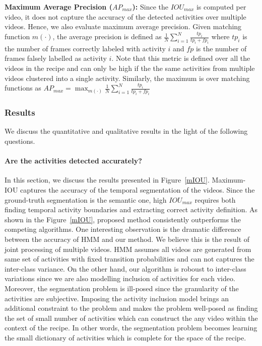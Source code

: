 \noindent\textbf{Maximum Average Precision ($AP_{max}$):}
Since the $IOU_{max}$ is computed per video, it does not capture the accuracy of the detected activities over multiple videos. Hence, we also evaluate maximum average precision. Given matching function $m(\cdot)$, the average precision is defined as $\frac{1}{N}\sum_{i =1}^N\frac{tp_i}{tp_i+fp_i}$ where $tp_i$ is the number of frames correctly labeled with activity $i$ and $fp$ is the number of frames falsely labelled as activity $i$. Note that this metric is defined over all the videos in the recipe and can only be high if the the same activities from multiple videos clustered into a single activity. Similarly, the maximum is over matching functions as \mbox{$AP_{max}=\max_{m(\cdot)} \frac{1}{N}\sum_{i =1}^N\frac{tp_i}{tp_i+fp_i}$} 


\subsubsection{Results}
We discuss the quantitative and qualitative results in the light of the following questions.
\paragraph{Are the activities detected accurately?}
In this section, we discuss the results presented in Figure~\ref{mIOU}. Maximum-IOU captures the accuracy of the temporal segmentation of the videos. Since the ground-truth segmentation is the semantic one, high $IOU_{max}$ requires both finding temporal activity boundaries and extracting correct activity definition. As shown in the Figure~\ref{mIOU}, proposed method consistently outperforms the competing algorithms. One interesting observation is the dramatic difference between the accuracy of HMM and our method. We believe this is the result of joint processing of multiple videos. HMM assumes all videos are generated from same set of activities with fixed transition probabilities and can not captures the inter-class variance. On the other hand, our algorithm is roboust to inter-class variations since we are also modelling inclusion of activities for each video. Moreover, the segmentation problem is ill-posed since the granularity of the activities are subjective. Imposing the activity inclusion model brings an additional constraint to the problem and makes the problem well-posed as finding the set of small number of activities which can construct the any video within the context of the recipe. In other words, the segmentation problem becomes learning the small dictionary of activities which is complete for the space of the recipe.

